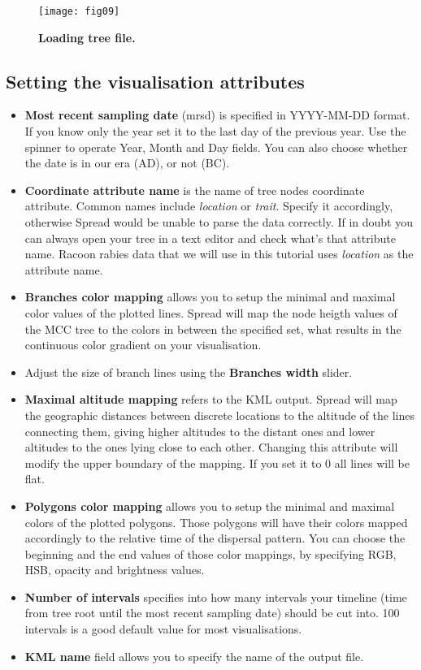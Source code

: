 \begin{figure}[h!]
\begin{centering}
\texttt{[image: fig09]}
\caption{
{ \footnotesize 
{\bf Loading tree file.}
} %
}
\label{fig:09}
\par\end{centering}
\end{figure}

\subsection{Setting the visualisation attributes}

\begin{itemize}
\item \textbf{Most recent sampling date} (mrsd) is specified in YYYY-MM-DD
format. If you know only the year set it to the last day of the previous
year. Use the spinner to operate Year, Month and Day fields. You can
also choose whether the date is in our era (AD), or not (BC). 
\item \textbf{Coordinate attribute name} is the name of tree nodes coordinate
attribute. Common names include \textsl{location} or \textsl{trait}.
Specify it accordingly, otherwise Spread would be unable to parse
the data correctly. If in doubt you can always open your tree in a
text editor and check what's that attribute name. Racoon rabies data
that we will use in this tutorial uses \textsl{location }as the attribute
name.
\item \textbf{Branches color mapping} allows you to setup the minimal and
maximal color values of the plotted lines. Spread will map the node
heigth values of the MCC tree to the colors in between the specified
set, what results in the continuous color gradient on your visualisation.
\item Adjust the size of branch lines using the \textbf{Branches width}
slider.
\item \textbf{Maximal altitude mapping} refers to the KML output. Spread
will map the geographic distances between discrete locations to the
altitude of the lines connecting them, giving higher altitudes to
the distant ones and lower altitudes to the ones lying close to each
other. Changing this attribute will modify the upper boundary of the
mapping. If you set it to 0 all lines will be flat.
\item \textbf{Polygons color mapping} allows you to setup the minimal and
maximal colors of the plotted polygons. Those polygons will have their
colors mapped accordingly to the relative time of the dispersal pattern.
You can choose the beginning and the end values of those color mappings,
by specifying RGB, HSB, opacity and brightness values.
\item \textbf{Number of intervals} specifies into how many intervals your
timeline (time from tree root until the most recent sampling date)
should be cut into. 100 intervals is a good default value for most
visualisations.
\item \textbf{KML name} field allows you to specify the name of the output
file.
\end{itemize}

